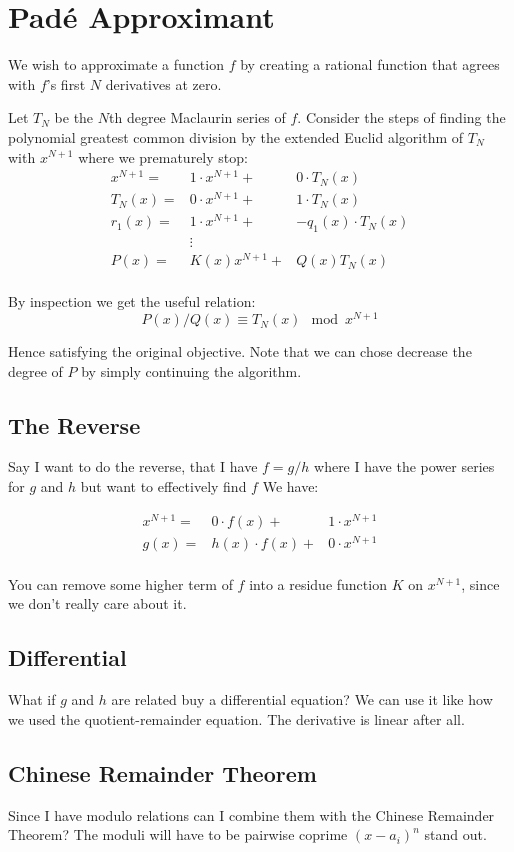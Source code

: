
\section{Padé Approximant}
We wish to approximate a function $f$ by creating a rational function that agrees with $f$'s first $N$ derivatives at zero.

Let $T_N$ be the $N$th degree Maclaurin series of $f$.
Consider the steps of finding the polynomial greatest common division by the extended Euclid algorithm of $T_N$ with $x^{N+1}$ where we prematurely stop:
\begin{equation*}
\begin{aligned}
	x^{N+1} =& 1\cdot x^{N+1} +& 0\cdot T_N(x) \\
	T_N(x) =& 0\cdot x^{N+1} +& 1\cdot T_N(x) \\
	r_1(x) =& 1\cdot x^{N+1} + & -q_1(x)\cdot T_N(x) \\
	& \vdots &\\
	P(x) =& K(x)x^{N+1} + & Q(x) T_N(x) \\
\end{aligned}
\end{equation*}

By inspection we get the useful relation:
\[P(x)/Q(x) \equiv T_N(x) \mod x^{N+1}\]

Hence satisfying the original objective.
Note that we can chose decrease the degree of $P$ by simply continuing the algorithm.

\subsection{The Reverse}
Say I want to do the reverse, that I have $f = g/h$ where I have the power series for $g$ and $h$ but want to effectively find $f$
We have:

\begin{equation*}
\begin{aligned}
	x^{N+1} =& 0\cdot f(x) + &1\cdot x^{N+1}\\
	g(x) =& h(x)\cdot f(x) +& 0\cdot x^{N+1} \\
\end{aligned}
\end{equation*}

You can remove some higher term of $f$ into a residue function $K$ on $x^{N+1}$, since we don't really care about it.

\subsection{Differential}
What if $g$ and $h$ are related buy a differential equation?
We can use it like how we used the quotient-remainder equation.
The derivative is linear after all.



\subsection{Chinese Remainder Theorem}
Since I have modulo relations can I combine them with the Chinese Remainder Theorem?
The moduli will have to be pairwise coprime $(x-a_i)^n$ stand out.
